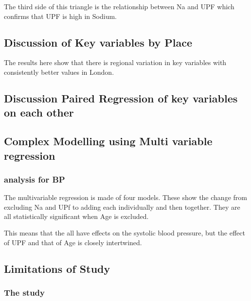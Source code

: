 \documentclass[
]{article}
\begin{document}
The third side of this triangle is the relationship between Na and UPF
which confirms that UPF is high in Sodium.

\hypertarget{discussion-of-key-variables-by-place}{%
\subsection{Discussion of Key variables by
Place}\label{discussion-of-key-variables-by-place}}

The results here show that there is regional variation in key variables
with consistently better values in London.

\hypertarget{discussion-paired-regression-of-key-variables-on-each-other}{%
\subsection{Discussion Paired Regression of key variables on each
other}\label{discussion-paired-regression-of-key-variables-on-each-other}}

\hypertarget{complex-modelling-using-multi-variable-regression-1}{%
\subsection{Complex Modelling using Multi variable
regression}\label{complex-modelling-using-multi-variable-regression-1}}

\hypertarget{analysis-for-bp}{%
\subsubsection{analysis for BP}\label{analysis-for-bp}}

The multivariable regression is made of four models. These show the
change from excluding Na and UPf to adding each individually and then
together. They are all statistically significant when Age is excluded.

This means that the all have effects on the systolic blood pressure, but
the effect of UPF and that of Age is closely intertwined.

\hypertarget{limitations-of-study}{%
\subsection{Limitations of Study}\label{limitations-of-study}}

\hypertarget{the-study}{%
\subsubsection{The study}\label{the-study}}
\end{document}
